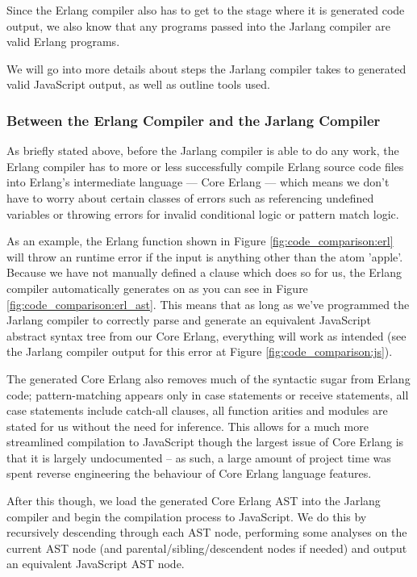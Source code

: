 \documentclass[twoside,12pt,titlepage,a4paper]{article}
\begin{document}
Since the Erlang compiler also has to get to the stage where it is generated code output, we also know that any programs passed into the Jarlang compiler are valid Erlang programs. 

We will go into more details about steps the Jarlang compiler takes to generated valid JavaScript output, as well as outline tools used.

\subsubsection{Between the Erlang Compiler and the Jarlang Compiler}
As briefly stated above, before the Jarlang compiler is able to do any work, the Erlang compiler has to more or less successfully compile Erlang source code files into Erlang's intermediate language --- Core Erlang --- which means we don't have to worry about certain classes of errors such as referencing undefined variables or throwing errors for invalid conditional logic or pattern match logic.

As an example, the Erlang function shown in Figure \ref{fig:code_comparison:erl} will throw an runtime error if the input is anything other than the atom 'apple'. Because we have not manually defined a clause which does so for us, the Erlang compiler automatically generates on as you can see in Figure \ref{fig:code_comparison:erl_ast}. This means that as long as we've programmed the Jarlang compiler to correctly parse and generate an equivalent JavaScript abstract syntax tree from our Core Erlang, everything will work as intended (see the Jarlang compiler output for this error at Figure \ref{fig:code_comparison:js}).

The generated Core Erlang also removes much of the syntactic sugar from Erlang code; pattern-matching appears only in case statements or receive statements, all case statements include catch-all clauses, all function arities and modules are stated for us without the need for inference. This allows for a much more streamlined compilation to JavaScript though the largest issue of Core Erlang is that it is largely undocumented -- as such, a large amount of project time was spent reverse engineering the behaviour of Core Erlang language features.

After this though, we load the generated Core Erlang AST into the Jarlang compiler and begin the compilation process to JavaScript. We do this by recursively descending through each AST node, performing some analyses on the current AST node (and parental/sibling/descendent nodes if needed) and output an equivalent JavaScript AST node.
\end{document}
